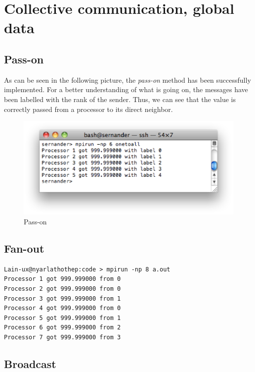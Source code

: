 \chapter{Collective communication, global data}

\section{Pass-on}

As can be seen in the following picture, the \textit{pass-on} method has been successfully implemented. For a better understanding of what is going on, the messages have been labelled with the rank of the sender. Thus, we can see that the value is correctly passed from a processor to its direct neighbor.
\begin{figure}[!h]
\begin{center}
	\includegraphics[width=\textwidth]{pic/passon.eps}
	\caption{Pass-on}
\end{center}
\end{figure}

\section{Fan-out}

\begin{verbatim}
Lain-ux@nyarlathothep:code > mpirun -np 8 a.out 
Processor 1 got 999.999000 from 0
Processor 2 got 999.999000 from 0
Processor 3 got 999.999000 from 1
Processor 4 got 999.999000 from 0
Processor 5 got 999.999000 from 1
Processor 6 got 999.999000 from 2
Processor 7 got 999.999000 from 3
\end{verbatim}

\section{Broadcast}

